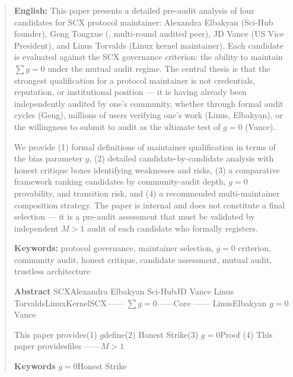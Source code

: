\documentclass[12pt,a4paper]{article}
\theoremstyle{remark}
\begin{document}
\begin{abstract}
\noindent
\textbf{English:}
This paper presents a detailed pre-audit analysis of four candidates for SCX
protocol maintainer: Alexandra Elbakyan (Sci-Hub founder), Geng Tongxue
(, multi-round audited peer), JD Vance (US Vice President), and Linus
Torvalds (Linux kernel maintainer). Each candidate is evaluated against the
SCX governance criterion: the ability to maintain $\sum g = 0$ under the mutual
audit regime. The central thesis is that the strongest qualification for a
protocol maintainer is not credentials, reputation, or institutional position —
it is having already been independently audited by one's community, whether
through formal audit cycles (Geng), millions of users verifying one's work
(Linus, Elbakyan), or the willingness to submit to audit as the ultimate
test of $g=0$ (Vance).

We provide (1) formal definitions of maintainer qualification in terms of
the bias parameter $g$, (2) detailed candidate-by-candidate analysis with
honest critique boxes identifying weaknesses and risks, (3) a comparative
framework ranking candidates by community-audit depth, $g=0$ provability, and
transition risk, and (4) a recommended multi-maintainer composition strategy.
The paper is internal and does not constitute a final selection — it is a
pre-audit assessment that must be validated by independent $M>1$ audit of
each candidate who formally registers.

\medskip
\noindent\textbf{Keywords:} protocol governance, maintainer selection,
$g=0$ criterion, community audit, honest critique, candidate assessment,
mutual audit, trustless architecture

\medskip
\noindent\textbf{Abstract}
SCXAlexandra Elbakyan
Sci-HubJD Vance
Linus TorvaldsLinuxKernelSCX——
$\sum g = 0$——Core
——
LinusElbakyan
$g=0$Vance

This paper provides(1) $g$define(2) 
Honest Strike(3) $g=0$Proof
(4) This paper providesfiles
——$M>1$

\medskip
\noindent\textbf{Keywords} $g=0$Honest Strike

\end{abstract}

\newpage
\tableofcontents
\newpage

\end{document}
